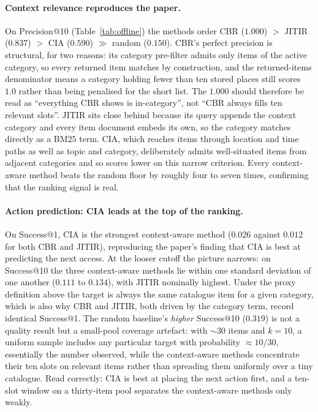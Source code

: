 \documentclass[acmlarge]{acmart}
\begin{document}
\paragraph{Context relevance reproduces the paper.}
On Precision@10 (Table~\ref{tab:offline}) the
methods order CBR ($1.000$) $>$ JITIR ($0.837$) $>$ CIA ($0.590$) $\gg$
random ($0.150$). CBR's perfect precision is structural, for two reasons:
its category pre-filter admits only items of the active category, so every
returned item matches by construction, and the returned-items denominator
means a category holding fewer than ten stored places still scores $1.0$
rather than being penalised for the short list. The $1.000$ should
therefore be read as ``everything CBR shows is in-category'', not ``CBR
always fills ten relevant slots''. JITIR sits close behind because its
query appends the context category and every item document embeds its
own, so the category matches directly as a BM25 term. CIA, which reaches
items through location and time
paths as well as topic and category, deliberately admits well-situated
items from adjacent categories and so scores lower on this narrow
criterion. Every context-aware method beats the random floor by roughly
four to seven times, confirming that the ranking signal is real.

\paragraph{Action prediction: CIA leads at the top of the ranking.}
On Success@1, CIA is the strongest context-aware method ($0.026$ against
$0.012$ for both CBR and JITIR), reproducing the paper's finding that CIA
is best at predicting the next access. At the looser cutoff the picture
narrows: on Success@10 the three context-aware methods lie within one
standard deviation of one another ($0.111$ to $0.134$), with JITIR
nominally highest. Under the proxy definition above the target is always
the same catalogue item for a given category, which is also why CBR and
JITIR, both driven by the category term, record identical Success@1. The
random baseline's \emph{higher} Success@10 ($0.319$) is not a quality
result but a small-pool coverage artefact: with $\sim$30 items and $k=10$,
a uniform sample includes any particular target with probability
$\approx 10/30$, essentially the number observed, while the context-aware
methods concentrate their ten slots on relevant items rather than
spreading them uniformly over a tiny
catalogue. Read correctly: CIA is best at placing the next action first,
and a ten-slot window on a thirty-item pool separates the context-aware
methods only weakly.
\end{document}
